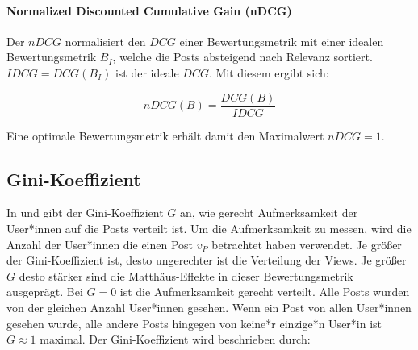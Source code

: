 \paragraph{Normalized Discounted Cumulative Gain (nDCG)}

Der $nDCG$ normalisiert den $DCG$ einer Bewertungsmetrik mit einer idealen Bewertungsmetrik $B_I$, welche die Posts absteigend nach Relevanz sortiert. $IDCG = DCG(B_I)$ ist der ideale $DCG$. Mit diesem ergibt sich:

\begin{equation}
\label{ndcg}
nDCG(B) = \frac{DCG(B)}{IDCG} 
\end{equation}

Eine optimale Bewertungsmetrik erhält damit den Maximalwert $nDCG = 1$.







\subsection{Gini-Koeffizient}

In \cite{Lerman2014} und \cite{Salganik2006854} gibt der Gini-Koeffizient $G$ an, wie gerecht Aufmerksamkeit der User*innen auf die Posts verteilt ist.
Um die Aufmerksamkeit zu messen, wird die Anzahl der User*innen die einen Post $v_P$ betrachtet haben verwendet. Je größer der Gini-Koeffizient ist, desto ungerechter ist die Verteilung der Views. Je größer $G$ desto stärker sind die Matthäus-Effekte in dieser Bewertungsmetrik ausgeprägt.
Bei $G = 0$ ist die Aufmerksamkeit gerecht verteilt. Alle Posts wurden von der gleichen Anzahl User*innen gesehen. Wenn ein Post von allen User*innen gesehen wurde, alle andere Posts hingegen von keine*r einzige*n User*in ist $G \approx 1$ maximal. Der Gini-Koeffizient wird beschrieben durch:

